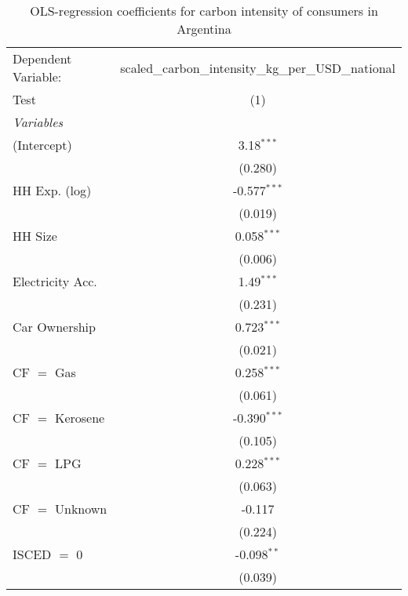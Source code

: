 
\begin{table}[htbp!]
   \centering
   \small
   \begin{adjustbox}{width = 1\textwidth, max height = 0.95\textheight, center}
      \begin{threeparttable}[b]
         \caption{\label{tab:OLS_1_ARG} OLS-regression coefficients for carbon intensity of consumers in Argentina}
         \begin{tabular}{lc}
            \tabularnewline \midrule \midrule
            Dependent Variable: & scaled\_carbon\_intensity\_kg\_per\_USD\_national\\        
            Test                & (1)\\  
            \midrule
            \emph{Variables}\\
            (Intercept)         & 3.18$^{***}$\\   
                                & (0.280)\\   
            HH Exp. (log)       & -0.577$^{***}$\\   
                                & (0.019)\\   
            HH Size             & 0.058$^{***}$\\   
                                & (0.006)\\   
            Electricity Acc.    & 1.49$^{***}$\\   
                                & (0.231)\\   
            Car Ownership       & 0.723$^{***}$\\   
                                & (0.021)\\   
            CF $=$ Gas          & 0.258$^{***}$\\   
                                & (0.061)\\   
            CF $=$ Kerosene     & -0.390$^{***}$\\   
                                & (0.105)\\   
            CF $=$ LPG          & 0.228$^{***}$\\   
                                & (0.063)\\   
            CF $=$ Unknown      & -0.117\\   
                                & (0.224)\\   
            ISCED $=$ 0         & -0.098$^{**}$\\   
                                & (0.039)\\   

\end{tabular}
\end{threeparttable}
\end{adjustbox}
\end{table}
